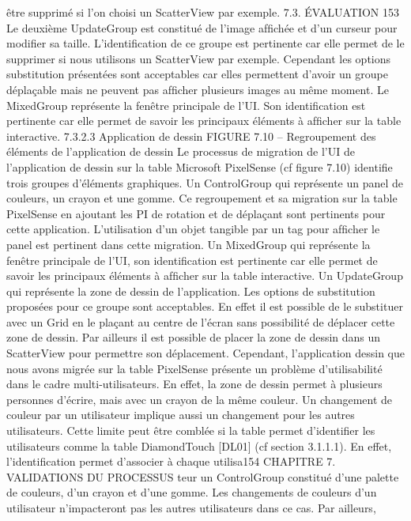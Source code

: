 \documentclass{article}
\begin{document}
\^{e}tre supprim\'{e} si l’on choisi un ScatterView par exemple.
7.3. ÉVALUATION
153
Le deuxi\`{e}me UpdateGroup est constitu\'{e} de l’image afﬁch\'{e}e et d’un curseur pour modiﬁer sa
taille. L’identiﬁcation de ce groupe est pertinente car elle permet de le supprimer si nous utilisons
un ScatterView par exemple. Cependant les options substitution pr\'{e}sent\'{e}es sont acceptables car elles
permettent d’avoir un groupe d\'{e}pla\c{c}able mais ne peuvent pas afﬁcher plusieurs images au m\^{e}me
moment.
Le MixedGroup repr\'{e}sente la fen\^{e}tre principale de l’UI. Son identiﬁcation est pertinente car elle
permet de savoir les principaux \'{e}l\'{e}ments \`{a} afﬁcher sur la table interactive.
7.3.2.3
Application de dessin
FIGURE 7.10 – Regroupement des \'{e}l\'{e}ments de l’application de dessin
Le processus de migration de l’UI de l’application de dessin sur la table Microsoft PixelSense (cf
ﬁgure 7.10) identiﬁe trois groupes d’\'{e}l\'{e}ments graphiques.
Un ControlGroup qui repr\'{e}sente un panel de couleurs, un crayon et une gomme. Ce regroupement
et sa migration sur la table PixelSense en ajoutant les PI de rotation et de d\'{e}pla\c{c}ant sont pertinents
pour cette application. L’utilisation d’un objet tangible par un tag pour afﬁcher le panel est pertinent
dans cette migration.
Un MixedGroup qui repr\'{e}sente la fen\^{e}tre principale de l’UI, son identiﬁcation est pertinente car
elle permet de savoir les principaux \'{e}l\'{e}ments \`{a} afﬁcher sur la table interactive.
Un UpdateGroup qui repr\'{e}sente la zone de dessin de l’application. Les options de substitution
propos\'{e}es pour ce groupe sont acceptables. En effet il est possible de le substituer avec un Grid en
le pla\c{c}ant au centre de l’\'{e}cran sans possibilit\'{e} de d\'{e}placer cette zone de dessin. Par ailleurs il est
possible de placer la zone de dessin dans un ScatterView pour permettre son d\'{e}placement. Cependant,
l’application dessin que nous avons migr\'{e}e sur la table PixelSense pr\'{e}sente un probl\`{e}me d’utilisabilit\'{e}
dans le cadre multi-utilisateurs. En effet, la zone de dessin permet \`{a} plusieurs personnes d’\'{e}crire, mais
avec un crayon de la m\^{e}me couleur. Un changement de couleur par un utilisateur implique aussi un
changement pour les autres utilisateurs.
Cette limite peut \^{e}tre combl\'{e}e si la table permet d’identiﬁer les utilisateurs comme la table DiamondTouch [DL01] (cf section 3.1.1.1). En effet, l’identiﬁcation permet d’associer \`{a} chaque utilisa154
CHAPITRE 7. VALIDATIONS DU PROCESSUS
teur un ControlGroup constitu\'{e} d’une palette de couleurs, d’un crayon et d’une gomme. Les changements de couleurs d’un utilisateur n’impacteront pas les autres utilisateurs dans ce cas. Par ailleurs,
\end{document}

